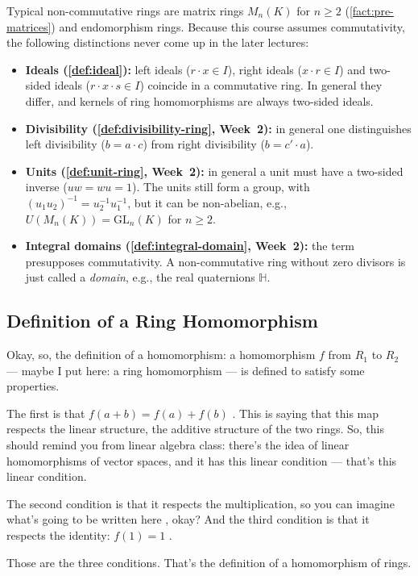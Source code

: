 \begin{aiNote}
Typical non-commutative rings are matrix rings $M_n(K)$ for $n \ge 2$ (\cref{fact:pre-matrices}) and endomorphism rings. Because this course assumes commutativity, the following distinctions never come up in the later lectures:
\begin{itemize}
    \item \textbf{Ideals (\cref{def:ideal}):} left ideals ($r \cdot x \in I$), right ideals ($x \cdot r \in I$) and two-sided ideals ($r \cdot x \cdot s \in I$) coincide in a commutative ring. In general they differ, and kernels of ring homomorphisms are always two-sided ideals.
    \item \textbf{Divisibility (\cref{def:divisibility-ring}, Week~2):} in general one distinguishes left divisibility ($b = a \cdot c$) from right divisibility ($b = c' \cdot a$).
    \item \textbf{Units (\cref{def:unit-ring}, Week~2):} in general a unit must have a two-sided inverse ($u w = w u = 1$). The units still form a group, with $(u_1 u_2)^{-1} = u_2^{-1} u_1^{-1}$, but it can be non-abelian, e.g., $U(M_n(K)) = \mathrm{GL}_n(K)$ for $n \ge 2$.
    \item \textbf{Integral domains (\cref{def:integral-domain}, Week~2):} the term presupposes commutativity. A non-commutative ring without zero divisors is just called a \emph{domain}, e.g., the real quaternions $\mathbb{H}$.
\end{itemize}
\end{aiNote}

\subsection{Definition of a Ring Homomorphism}

\begin{speech}[00:18:44 - 00:20:03]
Okay, so, the definition of a homomorphism: a homomorphism  $f$ from $R_1$ to $R_2$  --- maybe I put here: a ring homomorphism  --- is defined to satisfy some properties.

The first is that $f(a + b) = f(a) + f(b)$ . This is saying that this map respects the linear structure, the additive structure of the two rings. So, this should remind you from linear algebra class: there's the idea of linear homomorphisms of vector spaces, and it has this linear condition --- that's this linear condition.

The second condition is that it respects the multiplication, so you can imagine what's going to be written here , okay? And the third condition is that it respects the identity: $f(1) = 1$ .

Those are the three conditions. That's the definition of a homomorphism of rings.
\end{speech}

